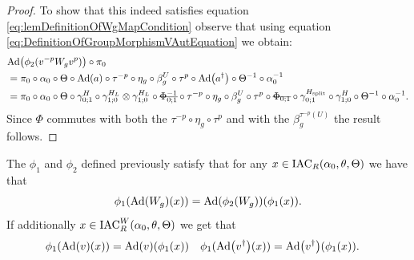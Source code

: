 \documentclass[12pt,a4paper,twoside]{article}
\numberwithin{equation}{section}
\begin{document}
\begin{proof}
	To show that this indeed satisfies equation \eqref{eq:lemDefinitionOfWgMapCondition} observe that using equation \eqref{eq:DefinitionOfGroupMorphismVAutEquation} we obtain:
	\begin{align}
		&\Ad{\phi_2(v^{-p}W_g v^{p})}\circ\pi_0\\
		&=\pi_0\circ \alpha_0\circ\Theta\circ\Ad{a}\circ\tau^{-p}\circ\eta_g\circ\beta_g^U\circ\tau^p\circ\Ad{a^{\dagger}}\circ\Theta^{-1}\circ\alpha_0^{-1}\\
		&=\pi_0\circ \alpha_0\circ\Theta\circ\gamma^H_{0;1}\circ\gamma^{H_L}_{1;0}\otimes\gamma^{H_L}_{1;0}\circ\stkout{\Phi_{0;1}^{-1}}\circ\tau^{-p}\circ\eta_g\circ\beta_g^U\circ\tau^p\circ\stkout{\Phi_{0;1}}\circ\gamma^{H_\text{split}}_{0;1}\circ\gamma^H_{1;0}\circ\Theta^{-1}\circ\alpha_0^{-1}.
	\end{align}
	Since $\Phi$ commutes with both the $\tau^{-p}\circ\eta_g\circ\tau^p$ and with the $\beta_g^{\tau^{-p}(U)}$ the result follows.
\end{proof}
\begin{lemma}\label{lem:phi1phi2matchingCondition}
	The $\phi_1$ and $\phi_2$ defined previously satisfy that for any $x\in\textrm{IAC}_R(\alpha_0,\theta,\Theta)$ we have that
	\begin{equation}
		\phi_1(\Ad{W_g}(x))=\Ad{\phi_2(W_g)}(\phi_1(x)).
	\end{equation}
	If additionally $x\in\textrm{IAC}_R^W(\alpha_0,\theta,\Theta)$ we get that
	\begin{align}
		\phi_1(\Ad{v}(x))&=\Ad{v}(\phi_1(x))&\phi_1(\Ad{v^\dagger}(x))&=\Ad{v^\dagger}(\phi_1(x)).
	\end{align}
\end{lemma}
\end{document}
